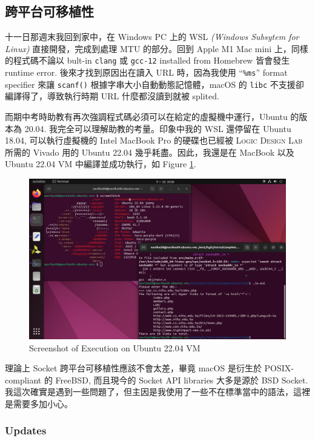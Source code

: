 \documentclass[12pt, a4paper]{article}
\begin{document}
\subsection{跨平台可移植性}

十一日那週末我回到家中，在 Windows PC 上的 WSL \textit{(Windows Subsytem for Linux)} 直接開發，完成到處理 MTU 的部分。回到 Apple M1 Mac mini 上，同樣的程式碼不論以 bult-in \texttt{clang} 或 \texttt{gcc-12} installed from \textsf{Homebrew} 皆會發生 runtime error. 後來才找到原因出在讀入 URL 時，因為我使用 ``\texttt{\%ms}'' format specifier 來讓 \texttt{scanf()} 根據字串大小自動動態記憶體，\textsf{macOS} 的 \texttt{libc} 不支援卻編譯得了，導致執行時期 URL 什麼都沒讀到就被 splited.

而期中考時助教有再次強調程式碼必須可以在給定的虛擬機中運行，\textsf{Ubuntu} 的版本為 20.04. 我完全可以理解助教的考量。印象中我的 WSL 還停留在 \textsf{Ubuntu} 18.04, 可以執行虛擬機的 \textsf{Intel MacBook Pro} 的硬碟也已經被 \textsc{Logic Design Lab} 所需的 \textsf{Vivado} 用的 \textsf{Ubuntu} 22.04 幾乎耗盡。因此，我還是在 MacBook 以及 \textsf{Ubuntu} 22.04 VM 中編譯並成功執行，如 Figure \ref{fig:screenshot_ubuntu}.

\begin{figure}[htbp]
\centering
\includegraphics[width=.795\linewidth]{screenshot_ubuntu}
\caption{Screenshot of Execution on \textsf{Ubuntu} 22.04 VM}
\label{fig:screenshot_ubuntu}
\end{figure}

理論上 \textsf{Socket} 跨平台可移植性應該不會太差，畢竟 \textsf{macOS} 是衍生於 \textsf{POSIX}-compliant 的 \textsf{FreeBSD}, 而且現今的 \textsf{Socket} API libraries 大多是源於 \textsf{BSD Socket}. 我這次確實是遇到一些問題了，但主因是我使用了一些不在標準當中的語法，這裡是需要多加小心。

\subsubsection{Updates}
\end{document}
